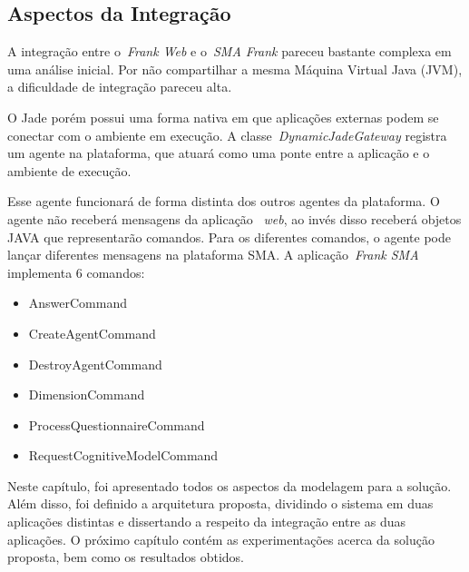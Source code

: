 \subsection{Aspectos da Integração}

A integração entre o~\emph{Frank Web} e o~\emph{SMA Frank} pareceu bastante complexa em uma análise inicial. Por não compartilhar a mesma Máquina Virtual Java (JVM), a dificuldade de integração pareceu alta.

O Jade porém possui uma forma nativa em que aplicações externas podem se conectar com o ambiente em execução. A classe~\emph{DynamicJadeGateway} registra um agente na plataforma, que atuará como uma ponte entre a aplicação e o ambiente de execução.

Esse agente funcionará de forma distinta dos outros agentes da plataforma. O agente não receberá mensagens da aplicação ~\emph{web}, ao invés disso receberá objetos JAVA que representarão comandos. Para os diferentes comandos, o agente pode lançar diferentes mensagens na plataforma SMA. A aplicação~\emph{Frank SMA} implementa 6 comandos:

\begin{itemize}
	\item AnswerCommand
	\item CreateAgentCommand
	\item DestroyAgentCommand
	\item DimensionCommand
	\item ProcessQuestionnaireCommand
	\item RequestCognitiveModelCommand
\end{itemize}

Neste capítulo, foi apresentado todos os aspectos da modelagem para a solução. Além disso, foi definido a arquitetura proposta, dividindo o sistema em duas aplicações distintas e dissertando a respeito da integração entre as duas aplicações. O próximo capítulo contém as experimentações acerca da solução proposta, bem como os resultados obtidos.























